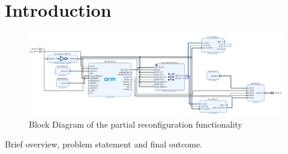 \section{Introduction}
\begin{figure}[t]
    \centering
    \includegraphics[width=\textwidth]{figures/pr_blockDesign.pdf}
    \caption{Block Diagram of the partial reconfiguration functionality}\label{fig:prBlockDesign}
\end{figure}

Brief overview, problem statement and final outcome.
